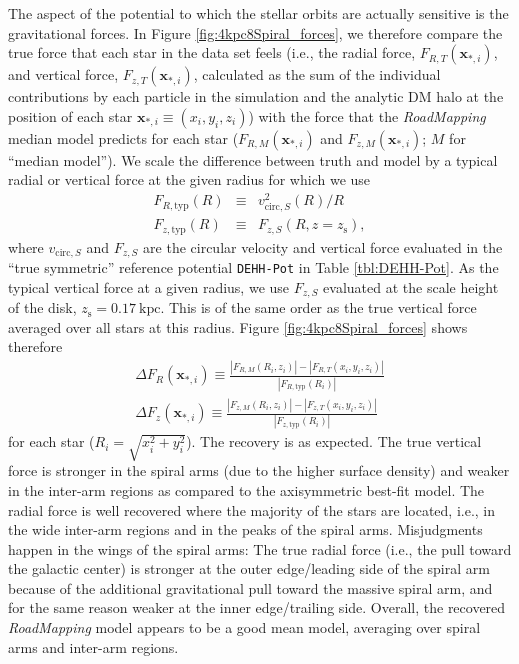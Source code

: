 \documentclass[iop,revtex4,numberedappendix,appendixfloats]{emulateapj}
\newcommand{\vect}[1]{\boldsymbol{#1}}
\newcommand{\RM}{{\sl RoadMapping}}
\begin{document}
The aspect of the potential to which the stellar orbits are actually sensitive is the gravitational forces. In Figure \ref{fig:4kpc8Spiral_forces}, we therefore compare the true force that each star in the data set feels (i.e., the radial force, $F_{R,T}(\vect{x}_{*,i})$, and vertical force, $F_{z,T}(\vect{x}_{*,i})$, calculated as the sum of the individual contributions by each particle in the simulation and the analytic DM halo at the position of each star $\vect{x}_{*,i}\equiv (x_i,y_i,z_i)$) with the force that the \RM{} median model predicts for each star ($F_{R,M}(\vect{x}_{*,i})$ and $F_{z,M}(\vect{x}_{*,i})$; $M$ for ``median model''). We scale the difference between truth and model by a typical radial or vertical force at the given radius for which we use
\begin{eqnarray}
F_{R,\text{typ}}(R) &\equiv& v^2_{\text{circ},S}(R) / R\label{eq:FRtyp}\\
F_{z,\text{typ}}(R) &\equiv& F_{z,S}(R,z=z_\text{s}),
\end{eqnarray}
where $v_{\text{circ},S}$ and $F_{z,S}$ are the circular velocity and vertical force evaluated in the ``true symmetric'' reference potential \texttt{DEHH-Pot} in Table \ref{tbl:DEHH-Pot}. As the typical vertical force at a given radius, we use $F_{z,S}$ evaluated at the scale height of the disk, $z_\text{s}=0.17~\text{kpc}$. This is of the same order as the true vertical force averaged over all stars at this radius. Figure \ref{fig:4kpc8Spiral_forces} shows therefore
\begin{eqnarray}
\Delta F_R(\vect{x}_{*,i}) \equiv \frac{|F_{R,M}(R_i,z_i)| - |F_{R,T}(x_i,y_i,z_i)|}{|F_{R,\text{typ}}(R_i)|}\label{eq:delta_FR}\\
\Delta F_z(\vect{x}_{*,i}) \equiv \frac{|F_{z,M}(R_i,z_i)| - |F_{z,T}(x_i,y_i,z_i)|}{|F_{z,\text{typ}}(R_i)|}\label{eq:delta_Fz}
\end{eqnarray}
for each star ($R_i = \sqrt{x_i^2+y_i^2}$). The recovery is as expected. The true vertical force is stronger in the spiral arms (due to the higher surface density) and weaker in the inter-arm regions as compared to the axisymmetric best-fit model. The radial force is well recovered where the majority of the stars are located, i.e., in the wide inter-arm regions and in the peaks of the spiral arms. Misjudgments happen in the wings of the spiral arms: The true radial force (i.e., the pull toward the galactic center) is stronger at the outer edge/leading side of the spiral arm because of the additional gravitational pull toward the massive spiral arm, and for the same reason weaker at the inner edge/trailing side. Overall, the recovered \RM{} model appears to be a good mean model, averaging over spiral arms and inter-arm regions.
\end{document}

